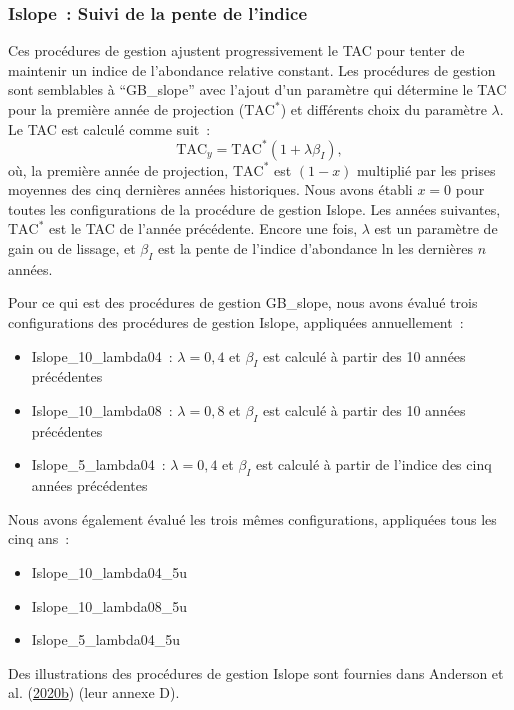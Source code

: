 \documentclass[french,11pt]{book}
\begin{document}
\hypertarget{sec:mp-islope-track}{%
\subsubsection{Islope~: Suivi de la pente de l'indice}\label{sec:mp-islope-track}}

Ces procédures de gestion ajustent progressivement le TAC pour tenter de maintenir un indice de l'abondance relative constant. Les procédures de gestion sont semblables à ``GB\_slope'' avec l'ajout d'un paramètre qui détermine le TAC pour la première année de projection (\(\textrm{TAC}^*\)) et différents choix du paramètre \(\lambda\). Le TAC est calculé comme suit~:
\begin{equation}
\textrm{TAC}_y = \textrm{TAC}^*(1+\lambda \beta_I),
\end{equation}
où, la première année de projection, \(\textrm{TAC}^*\) est \((1-x)\) multiplié par les prises moyennes des cinq dernières années historiques. Nous avons établi \(x = 0\) pour toutes les configurations de la procédure de gestion Islope. Les années suivantes, \(\textrm{TAC}^*\) est le TAC de l'année précédente. Encore une fois, \(\lambda\) est un paramètre de gain ou de lissage, et \(\beta_I\) est la pente de l'indice d'abondance ln les dernières \(n\) années.

Pour ce qui est des procédures de gestion GB\_slope, nous avons évalué trois configurations des procédures de gestion Islope, appliquées annuellement~:
\begin{itemize}
\item
  Islope\_10\_lambda04~: \(\lambda = 0,4\) et \(\beta_I\) est calculé à partir des 10 années précédentes
\item
  Islope\_10\_lambda08~: \(\lambda = 0,8\) et \(\beta_I\) est calculé à partir des 10 années précédentes
\item
  Islope\_5\_lambda04~: \(\lambda = 0,4\) et \(\beta_I\) est calculé à partir de l'indice des cinq années précédentes
\end{itemize}
Nous avons également évalué les trois mêmes configurations, appliquées tous les cinq ans~:
\begin{itemize}
\item
  Islope\_10\_lambda04\_5u
\item
  Islope\_10\_lambda08\_5u
\item
  Islope\_5\_lambda04\_5u
\end{itemize}
Des illustrations des procédures de gestion Islope sont fournies dans Anderson et al. (\protect\hyperlink{ref-anderson2020gfmp}{2020}\protect\hyperlink{ref-anderson2020gfmp}{b}) (leur annexe D).
\end{document}

